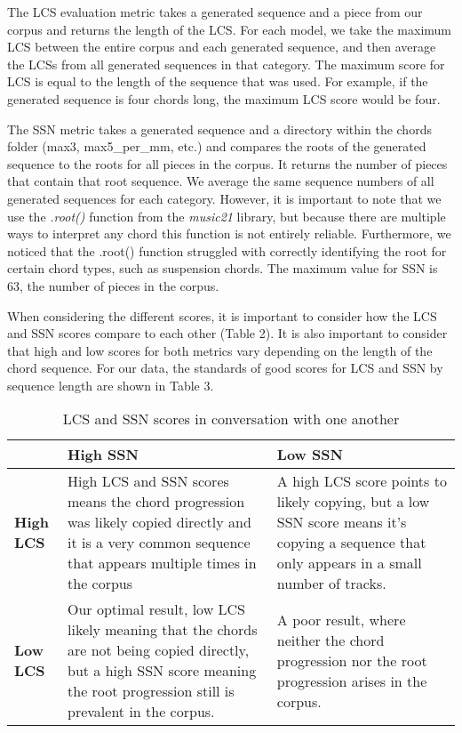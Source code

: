\documentclass[11pt,a4paper]{article}
\begin{document}
The LCS evaluation metric takes a generated sequence and a piece from our corpus and returns the length of the LCS. For each model, we take the maximum LCS between the entire corpus and each generated sequence, and then average the LCSs from all generated sequences in that category. The maximum score for LCS is equal to the length of the sequence that was used. For example, if the generated sequence is four chords long, the maximum LCS score would be four. 

The SSN metric takes a generated sequence and a directory within the chords folder (max3, max5\_per\_mm, etc.) and compares the roots of the generated sequence to the roots for all pieces in the corpus. It returns the number of pieces that contain that root sequence. We average the same sequence numbers of all generated sequences for each category. However, it is important to note that we use the \emph{.root()} function from the \emph{music21} library, but because there are multiple ways to interpret any chord this function is not entirely reliable. Furthermore, we noticed that the .root() function struggled with correctly identifying the root for certain chord types, such as suspension chords. The maximum value for SSN is 63, the number of pieces in the corpus. 

When considering the different scores, it is important to consider how the LCS and SSN scores compare to each other (Table 2). It is also important to consider that high and low scores for both metrics vary depending on the length of the chord sequence. For our data, the standards of good scores for LCS and SSN by sequence length are shown in Table 3.

\begin{table*}
\centering
\begin{tabularx}{\textwidth}{|l|X|X|}
\hline  & \textbf{High SSN} & \textbf{Low SSN} \\
\hline 
\textbf{High LCS} & High LCS and SSN scores means the chord progression was likely copied directly and it is a very common sequence that appears multiple times in the corpus & A high LCS score points to likely copying, but a low SSN score means it’s copying a sequence that only appears in a small number of tracks.  \\
\hline 
\textbf{Low LCS} & Our optimal result, low LCS likely meaning that the chords are not being copied directly, but a high SSN score meaning the root progression still is prevalent in the corpus. & A poor result, where neither the chord progression nor the root progression arises in the corpus. \\
\hline
\end{tabularx}
\caption{\label{LCS & SSN} LCS and SSN scores in conversation with one another}
\end{table*}
\end{document}
